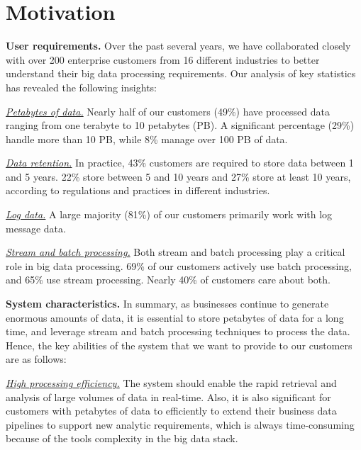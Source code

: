 \section{Motivation} 
\label{sec:motivation}

\noindent \textbf{User requirements.} Over the past several years, we have collaborated closely with over 200 enterprise customers from 16 different industries to better understand their big data processing requirements. Our analysis of key statistics has revealed the following insights:

\noindent \underline{\textit{Petabytes of data.}} Nearly half of our customers (49\%) have processed data ranging from one terabyte to 10 petabytes (PB). A significant percentage (29\%) handle more than 10 PB, while 8\% manage over 100 PB of data.

\noindent \underline{\textit{Data retention.}} In practice, 43\% customers are required to store data between 1 and 5 years. 22\% store between 5 and 10 years and 27\% store at least 10 years, according to regulations and practices in different industries.
 
 
\noindent \underline{\textit{Log data.}} A large majority (81\%) of our customers primarily work with log message data.

\noindent \underline{\textit{Stream and batch processing.}} Both stream and batch processing play a critical role in big data processing. 69\% of our customers actively use batch processing, and 65\% use stream processing. Nearly 40\% of customers care about both.


\noindent \textbf{System characteristics.} In summary, as businesses continue to generate  enormous amounts of data, it is essential to store petabytes of data for a long time, and leverage stream and batch processing techniques to process the data. Hence, the key abilities of the system that we want to provide to our customers are as follows:




\noindent \underline{\textit{High processing efficiency.}} The system should enable the rapid retrieval and analysis of large volumes of data in real-time. Also, it is also significant for customers with petabytes of data to efficiently to extend their business data pipelines to support new analytic requirements, which is always time-consuming because of the tools complexity in the big data stack.


